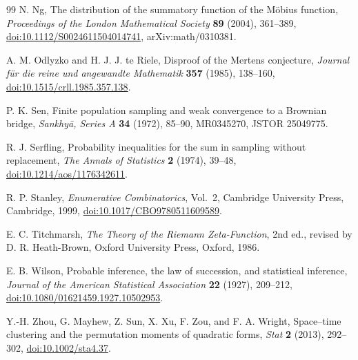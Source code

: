 \documentclass[11pt,reqno]{amsart}
\numberwithin{equation}{section}
\theoremstyle{plain}
\theoremstyle{definition}
\theoremstyle{remark}
\begin{document}
\begin{thebibliography}{99}
N. Ng,
\newblock The distribution of the summatory function of the M\"obius
function,
\newblock \emph{Proceedings of the London Mathematical Society}
\textbf{89} (2004), 361--389,
\newblock \href{https://doi.org/10.1112/S0024611504014741}
{doi:10.1112/S0024611504014741}, arXiv:math/0310381.

A. M. Odlyzko and H. J. J. te Riele,
\newblock Disproof of the Mertens conjecture,
\newblock \emph{Journal f\"ur die reine und angewandte Mathematik}
\textbf{357} (1985), 138--160,
\newblock \href{https://doi.org/10.1515/crll.1985.357.138}
{doi:10.1515/crll.1985.357.138}.

P. K. Sen,
\newblock Finite population sampling and weak convergence to a Brownian
bridge,
\newblock \emph{Sankhy\=a, Series A} \textbf{34} (1972), 85--90,
\newblock MR0345270, JSTOR 25049775.

R. J. Serfling,
\newblock Probability inequalities for the sum in sampling without
replacement,
\newblock \emph{The Annals of Statistics} \textbf{2} (1974), 39--48,
\newblock \href{https://doi.org/10.1214/aos/1176342611}
{doi:10.1214/aos/1176342611}.

R. P. Stanley,
\newblock \emph{Enumerative Combinatorics}, Vol.~2,
\newblock Cambridge University Press, Cambridge, 1999,
\newblock \href{https://doi.org/10.1017/CBO9780511609589}
{doi:10.1017/CBO9780511609589}.

E. C. Titchmarsh,
\newblock \emph{The Theory of the Riemann Zeta-Function}, 2nd ed.,
\newblock revised by D. R. Heath-Brown,
\newblock Oxford University Press, Oxford, 1986.

E. B. Wilson,
\newblock Probable inference, the law of succession, and statistical
inference,
\newblock \emph{Journal of the American Statistical Association}
\textbf{22} (1927), 209--212,
\newblock \href{https://doi.org/10.1080/01621459.1927.10502953}
{doi:10.1080/01621459.1927.10502953}.

Y.-H. Zhou, G. Mayhew, Z. Sun, X. Xu, F. Zou, and F. A. Wright,
\newblock Space--time clustering and the permutation moments of quadratic
forms,
\newblock \emph{Stat} \textbf{2} (2013), 292--302,
\newblock \href{https://doi.org/10.1002/sta4.37}
{doi:10.1002/sta4.37}.

\end{thebibliography}
\end{document}
